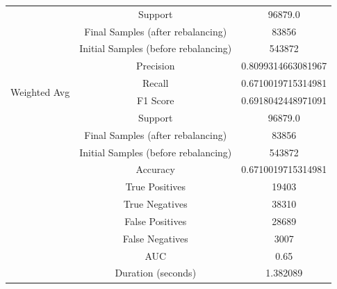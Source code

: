 \begin{longtable}{|c|c|c|}
 & Support & 96879.0 \\
 & Final Samples (after rebalancing) & 83856 \\
 & Initial Samples (before rebalancing) & 543872 \\
\hline
\multirow{4}{*}{Weighted Avg} & Precision & 0.8099314663081967 \\
 & Recall & 0.6710019715314981 \\
 & F1 Score & 0.6918042448971091 \\
 & Support & 96879.0 \\
 & Final Samples (after rebalancing) & 83856 \\
 & Initial Samples (before rebalancing) & 543872 \\
\hline
& Accuracy & 0.6710019715314981 \\ \hline
& True Positives & 19403 \\ \hline
& True Negatives & 38310 \\ \hline
& False Positives & 28689 \\ \hline
& False Negatives & 3007 \\ \hline
& AUC & 0.65 \\ \hline
& Duration (seconds) & 1.382089 \\ \hline
\end{longtable}


